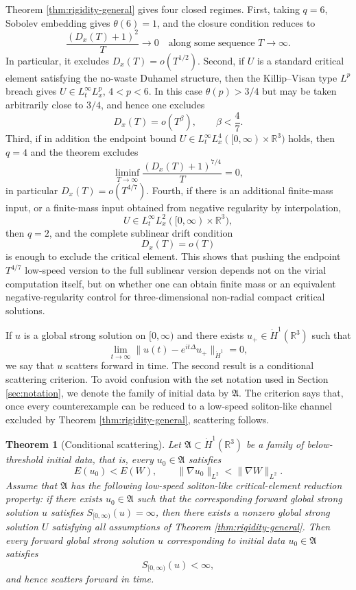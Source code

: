 \documentclass[smallextended,envcountsect,nospthms]{svjour3}
\numberwithin{equation}{section}
\theoremstyle{spbreak}
\newtheorem{theorem}{Theorem}[section]
\theoremstyle{spdefbreak}
\theoremstyle{spdefbreak}
\newcommand{\R}{\mathbb R}
\begin{document}
Theorem \ref{thm:rigidity-general} gives four closed regimes. First, taking $q=6$, Sobolev embedding gives $\theta(6)=1$, and the closure condition reduces to
\[
  \frac{(D_x(T)+1)^2}{T}\to0
  \quad\text{along some sequence }T\to\infty.
\]
In particular, it excludes $D_x(T)=o(T^{1/2})$. Second, if $U$ is a standard critical element satisfying the no-waste Duhamel structure, then the Killip--Visan type $L^p$ breach gives $U\in L_t^\infty L_x^p$, $4<p<6$. In this case $\theta(p)>3/4$ but may be taken arbitrarily close to $3/4$, and hence one excludes
\[
  D_x(T)=o(T^\beta),
  \qquad \beta<\frac47.
\]
Third, if in addition the endpoint bound $U\in L_t^\infty L_x^4([0,\infty)\times\R^3)$ holds, then $q=4$ and the theorem excludes
\begin{equation}\label{eq:L4-endpoint-sequence-intro}
  \liminf_{T\to\infty}\frac{(D_x(T)+1)^{7/4}}{T}=0,
\end{equation}
in particular $D_x(T)=o(T^{4/7})$. Fourth, if there is an additional finite-mass input, or a finite-mass input obtained from negative regularity by interpolation,
\[
  U\in L_t^\infty L_x^2([0,\infty)\times\R^3),
\]
then $q=2$, and the complete sublinear drift condition
\[
  D_x(T)=o(T)
\]
is enough to exclude the critical element. This shows that pushing the endpoint $T^{4/7}$ low-speed version to the full sublinear version depends not on the virial computation itself, but on whether one can obtain finite mass or an equivalent negative-regularity control for three-dimensional non-radial compact critical solutions.

If $u$ is a global strong solution on $[0,\infty)$ and there exists $u_+\in\dot H^1(\R^3)$ such that
\[
  \lim_{t\to\infty}\|u(t)-e^{it\Delta}u_+\|_{\dot H^1}=0,
\]
we say that $u$ scatters forward in time. The second result is a conditional scattering criterion. To avoid confusion with the set notation used in Section \ref{sec:notation}, we denote the family of initial data by $\mathfrak A$. The criterion says that, once every counterexample can be reduced to a low-speed soliton-like channel excluded by Theorem \ref{thm:rigidity-general}, scattering follows.

\begin{theorem}[Conditional scattering]\label{thm:scattering-conditional}
Let $\mathfrak A\subset\dot H^1(\R^3)$ be a family of below-threshold initial data, that is, every $u_0\in\mathfrak A$ satisfies
\[
  E(u_0)<E(W),
  \qquad \|\nabla u_0\|_{L^2}<\|\nabla W\|_{L^2}.
\]
Assume that $\mathfrak A$ has the following low-speed soliton-like critical-element reduction property: if there exists $u_0\in\mathfrak A$ such that the corresponding forward global strong solution $u$ satisfies $S_{[0,\infty)}(u)=\infty$, then there exists a nonzero global strong solution $U$ satisfying all assumptions of Theorem \ref{thm:rigidity-general}. Then every forward global strong solution $u$ corresponding to initial data $u_0\in\mathfrak A$ satisfies
\[
  S_{[0,\infty)}(u)<\infty,
\]
and hence scatters forward in time.
\end{theorem}
\end{document}
